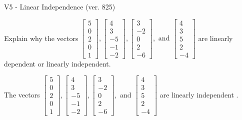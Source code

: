 \begin{exercise}
  \begin{exerciseTitle}V5 - Linear Independence (ver. 825)\end{exerciseTitle}
  \begin{exerciseStatement}
    Explain why the vectors \(\left[\begin{array}{r}
5 \\
0 \\
2 \\
0 \\
1
\end{array}\right] , \left[\begin{array}{r}
4 \\
3 \\
-5 \\
-1 \\
-2
\end{array}\right] , \left[\begin{array}{r}
3 \\
-2 \\
0 \\
2 \\
-6
\end{array}\right] , \text{ and } \left[\begin{array}{r}
4 \\
3 \\
5 \\
2 \\
-4
\end{array}\right]\) are linearly dependent or linearly independent.	


  \end{exerciseStatement}
  \begin{exerciseAnswer}
   The vectors \(\left[\begin{array}{r}
5 \\
0 \\
2 \\
0 \\
1
\end{array}\right] , \left[\begin{array}{r}
4 \\
3 \\
-5 \\
-1 \\
-2
\end{array}\right] , \left[\begin{array}{r}
3 \\
-2 \\
0 \\
2 \\
-6
\end{array}\right] , \text{ and } \left[\begin{array}{r}
4 \\
3 \\
5 \\
2 \\
-4
\end{array}\right]\) are 
  	 linearly independent  .
  


  \end{exerciseAnswer}
\end{exercise}